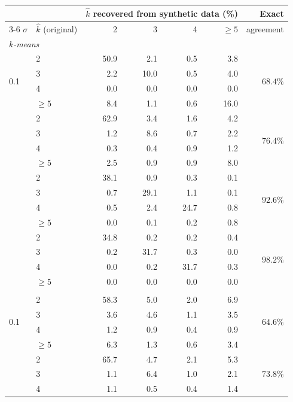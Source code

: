 \begin{tabular}{llrrrrr}
\toprule
 & & \multicolumn{4}{c}{$\hat{k}$ recovered from synthetic data (\%)} & Exact \\
\cmidrule(lr){3-6}
$\sigma$ & $\hat{k}$ (original) & 2 & 3 & 4 & $\geq 5$ & agreement \\
\midrule
\multicolumn{7}{l}{\textit{$k$-means}} \\
\multirow{4}{*}{0.1} & 2 & 50.9 & 2.1 & 0.5 & 3.8 & \multirow{4}{*}{$68.4\%$} \\
 & 3 & 2.2 & 10.0 & 0.5 & 4.0 &  \\
 & 4 & 0.0 & 0.0 & 0.0 & 0.0 &  \\
 & $\geq 5$ & 8.4 & 1.1 & 0.6 & 16.0 &  \\
\addlinespace
\multirow{4}{*}{2} & 2 & 62.9 & 3.4 & 1.6 & 4.2 & \multirow{4}{*}{$76.4\%$} \\
 & 3 & 1.2 & 8.6 & 0.7 & 2.2 &  \\
 & 4 & 0.3 & 0.4 & 0.9 & 1.2 &  \\
 & $\geq 5$ & 2.5 & 0.9 & 0.9 & 8.0 &  \\
\addlinespace
\multirow{4}{*}{6} & 2 & 38.1 & 0.9 & 0.3 & 0.1 & \multirow{4}{*}{$92.6\%$} \\
 & 3 & 0.7 & 29.1 & 1.1 & 0.1 &  \\
 & 4 & 0.5 & 2.4 & 24.7 & 0.8 &  \\
 & $\geq 5$ & 0.0 & 0.1 & 0.2 & 0.8 &  \\
\addlinespace
\multirow{4}{*}{10} & 2 & 34.8 & 0.2 & 0.2 & 0.4 & \multirow{4}{*}{$98.2\%$} \\
 & 3 & 0.2 & 31.7 & 0.3 & 0.0 &  \\
 & 4 & 0.0 & 0.2 & 31.7 & 0.3 &  \\
 & $\geq 5$ & 0.0 & 0.0 & 0.0 & 0.0 &  \\
\addlinespace
\midrule
\multicolumn{7}{l}{\textit{Ward}} \\
\multirow{4}{*}{0.1} & 2 & 58.3 & 5.0 & 2.0 & 6.9 & \multirow{4}{*}{$64.6\%$} \\
 & 3 & 3.6 & 4.6 & 1.1 & 3.5 &  \\
 & 4 & 1.2 & 0.9 & 0.4 & 0.9 &  \\
 & $\geq 5$ & 6.3 & 1.3 & 0.6 & 3.4 &  \\
\addlinespace
\multirow{4}{*}{2} & 2 & 65.7 & 4.7 & 2.1 & 5.3 & \multirow{4}{*}{$73.8\%$} \\
 & 3 & 1.1 & 6.4 & 1.0 & 2.1 &  \\
 & 4 & 1.1 & 0.5 & 0.4 & 1.4 &  \\

\end{tabular}
